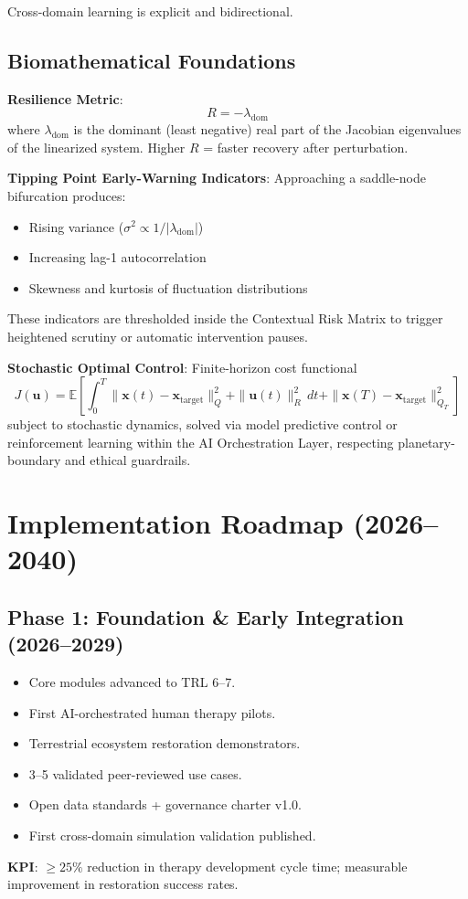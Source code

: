 \documentclass[11pt,a4paper]{article}
\begin{document}
Cross-domain learning is explicit and bidirectional.

\subsection{Biomathematical Foundations}

\textbf{Resilience Metric}:
\[
R = -\lambda_\text{dom}
\]
where $\lambda_\text{dom}$ is the dominant (least negative) real part of the Jacobian eigenvalues of the linearized system. Higher $R$ = faster recovery after perturbation.

\textbf{Tipping Point Early-Warning Indicators}:
Approaching a saddle-node bifurcation produces:
\begin{itemize}
    \item Rising variance ($\sigma^2 \propto 1/|\lambda_\text{dom}|$)
    \item Increasing lag-1 autocorrelation
    \item Skewness and kurtosis of fluctuation distributions
\end{itemize}

These indicators are thresholded inside the Contextual Risk Matrix to trigger heightened scrutiny or automatic intervention pauses.

\textbf{Stochastic Optimal Control}:
Finite-horizon cost functional
\[
J(\mathbf{u}) = \mathbb{E}\left[ \int_0^T \|\mathbf{x}(t) - \mathbf{x}_\text{target}\|_Q^2 + \|\mathbf{u}(t)\|_R^2 \, dt + \|\mathbf{x}(T) - \mathbf{x}_\text{target}\|_{Q_T}^2 \right]
\]
subject to stochastic dynamics, solved via model predictive control or reinforcement learning within the AI Orchestration Layer, respecting planetary-boundary and ethical guardrails.

\section{Implementation Roadmap (2026--2040)}

\subsection{Phase 1: Foundation \& Early Integration (2026--2029)}
\begin{itemize}
    \item Core modules advanced to TRL 6--7.
    \item First AI-orchestrated human therapy pilots.
    \item Terrestrial ecosystem restoration demonstrators.
    \item 3--5 validated peer-reviewed use cases.
    \item Open data standards + governance charter v1.0.
    \item First cross-domain simulation validation published.
\end{itemize}
\textbf{KPI}: $\geq 25\%$ reduction in therapy development cycle time; measurable improvement in restoration success rates.
\end{document}
